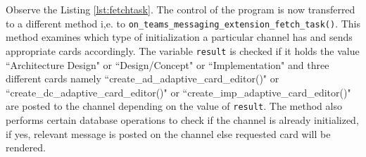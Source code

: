 Observe the Listing \ref{lst:fetchtask}. The control of the program is now transferred to a different method i,e. to
\texttt{on\_teams\_messaging\_extension\_fetch\_task()}. This method examines which type of initialization a particular channel has and sends appropriate cards accordingly. The variable \texttt{result} is checked if it holds the value ``Architecture
Design" or ``Design/Concept" or ``Implementation" and three different cards namely ``create\_ad\_adaptive\_card\_editor()" or ``create\_dc\_adaptive\_card\_editor()" or ``create\_imp\_adaptive\_card\_editor()" are posted to the channel depending on the value of \texttt{result}. The method also performs certain database operations to check if the channel is already initialized, if yes, relevant message is posted on the channel else requested card will be rendered. 

